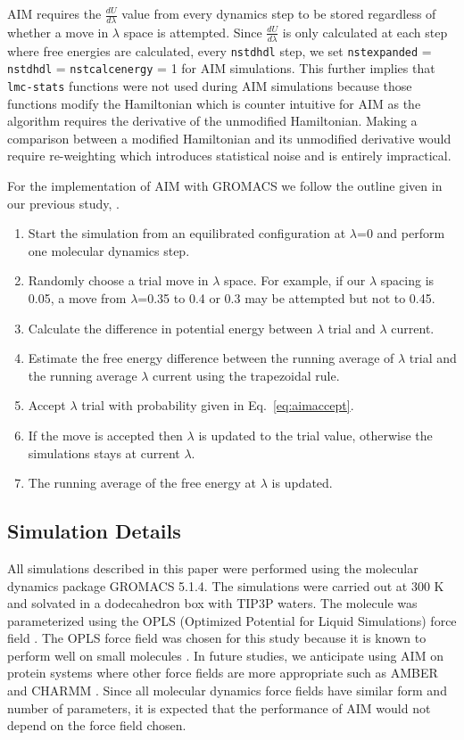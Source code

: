 \documentclass[fleqn,10pt,lineno]{wlpeerj} %
\begin{document}
AIM requires the $\frac{dU}{d\lambda}$ value from every dynamics step to be stored regardless of whether a move in $\lambda$ space is attempted. Since $\frac{dU}{d\lambda}$ is only calculated at each step where free energies are calculated, every \texttt{nstdhdl} step, we set \texttt{nstexpanded} = \texttt{nstdhdl} = \texttt{nstcalcenergy} = 1 for AIM simulations. This further implies that \texttt{lmc-stats} functions were not used during AIM simulations because those functions modify the Hamiltonian which is counter intuitive for AIM as the algorithm requires the derivative of the unmodified Hamiltonian. Making a comparison between a modified Hamiltonian and its unmodified derivative would require re-weighting which introduces statistical noise and is entirely impractical.

For the implementation of AIM with GROMACS we follow the outline given in our previous study, \cite{Ytreberg2006}. 
\begin{enumerate}
\item Start the simulation from an equilibrated configuration at $\lambda$=0 and perform one molecular dynamics step. 
\item Randomly choose a trial move in $\lambda$ space. For example, if our $\lambda$ spacing is 0.05, a move from $\lambda$=0.35 to 0.4 or 0.3 may be attempted but not to 0.45. 
\item Calculate the difference in potential energy between $\lambda$ trial and $\lambda$ current.
\item Estimate the free energy difference between the running average of $\lambda$ trial and the running average $\lambda$ current using the trapezoidal rule. 
\item Accept $\lambda$ trial with probability given in Eq.\ \ref{eq:aimaccept}.
\item If the move is accepted then $\lambda$ is updated to the trial value, otherwise the simulations stays at current $\lambda$.
\item The running average of the free energy at $\lambda$ is updated.
\end{enumerate}

\subsection*{Simulation Details} \label{details}

All simulations described in this paper were performed using the molecular dynamics package GROMACS 5.1.4. The simulations were carried out at 300 K and solvated in a dodecahedron box with TIP3P waters. The molecule was parameterized using the OPLS (Optimized Potential for Liquid Simulations) force field \citep{Jorgensen1996}. The OPLS force field was chosen for this study because it is known to perform well on small molecules \citep{Shirts2003}. In future studies, we anticipate using AIM on protein systems where other force fields are more appropriate such as AMBER \citep{Salomon-Ferrer2013} and CHARMM \citep{Mackerell2001}. Since all molecular dynamics force fields have similar form and number of parameters, it is expected that the performance of AIM would not depend on the force field chosen. 
\end{document}
